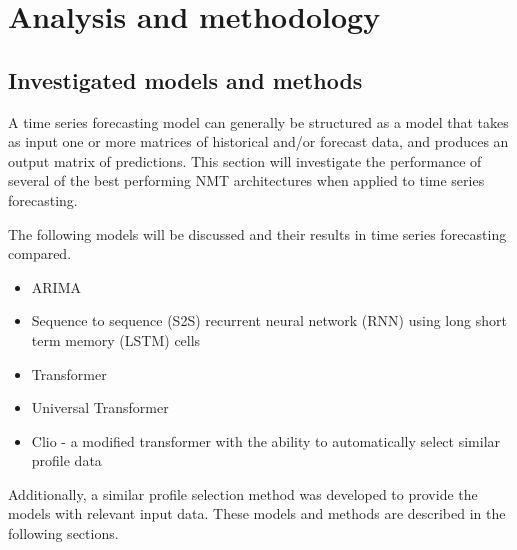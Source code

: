 \chapter{Analysis and methodology}
\label{ana-meth}

\section{Investigated models and methods}
A time series forecasting model can generally be structured as a model that takes as input one or more matrices of historical and/or forecast data, and produces an output matrix of predictions.
This section will investigate the performance of several of the best performing NMT architectures when applied to time series forecasting.

The following models will be discussed and their results in time series forecasting compared.
\begin{itemize}
	\item ARIMA
	\item Sequence to sequence (S2S) recurrent neural network (RNN) \citep{Cho2014a} using long short term memory (LSTM) \citep{hochreiter1997long} cells
	\item Transformer \citep{Vaswani2017}
	\item Universal Transformer \cite{Dehghani2018}
	\item Clio - a modified transformer with the ability to automatically select similar profile data
\end{itemize}

Additionally, a similar profile selection method was developed to provide the models with relevant input data.
These models and methods are described in the following sections.

